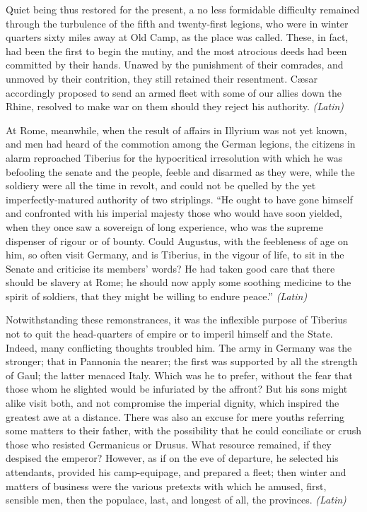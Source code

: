 
Quiet being thus restored for the present, a no less formidable difficulty remained through the turbulence of the fifth and twenty-first legions, who were in winter quarters sixty miles away at Old Camp, as the place was called. These, in fact, had been the first to begin the mutiny, and the most atrocious deeds had been committed by their hands. Unawed by the punishment of their comrades, and unmoved by their contrition, they still retained their resentment. Cæsar accordingly proposed to send an armed fleet with some of our allies down the Rhine, resolved to make war on them should they reject his authority. \emph{(Latin)}


At Rome, meanwhile, when the result of affairs in Illyrium was not yet known, and men had heard of the commotion among the German legions, the citizens in alarm reproached Tiberius for the hypocritical irresolution with which he was befooling the senate and the people, feeble and disarmed as they were, while the soldiery were all the time in revolt, and could not be quelled by the yet imperfectly-matured authority of two striplings. ``He ought to have gone himself and confronted with his imperial majesty those who would have soon yielded, when they once saw a sovereign of long experience, who was the supreme dispenser of rigour or of bounty. Could Augustus, with the feebleness of age on him, so often visit Germany, and is Tiberius, in the vigour of life, to sit in the Senate and criticise its members' words? He had taken good care that there should be slavery at Rome; he should now apply some soothing medicine to the spirit of soldiers, that they might be willing to endure peace.'' \emph{(Latin)}


Notwithstanding these remonstrances, it was the inflexible purpose of Tiberius not to quit the head-quarters of empire or to imperil himself and the State. Indeed, many conflicting thoughts troubled him. The army in Germany was the stronger; that in Pannonia the nearer; the first was supported by all the strength of Gaul; the latter menaced Italy. Which was he to prefer, without the fear that those whom he slighted would be infuriated by the affront? But his sons might alike visit both, and not compromise the imperial dignity, which inspired the greatest awe at a distance. There was also an excuse for mere youths referring some matters to their father, with the possibility that he could conciliate or crush those who resisted Germanicus or Drusus. What resource remained, if they despised the emperor? However, as if on the eve of departure, he selected his attendants, provided his camp-equipage, and prepared a fleet; then winter and matters of business were the various pretexts with which he amused, first, sensible men, then the populace, last, and longest of all, the provinces. \emph{(Latin)}

